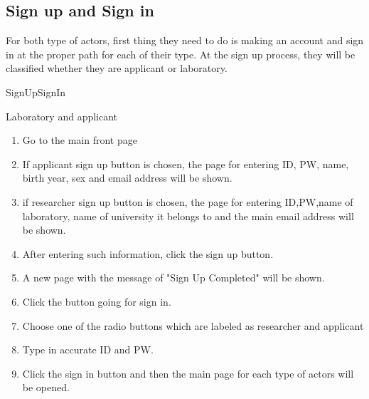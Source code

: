 \documentclass[letterpaper, 10 pt, conference]{ieeeconf}  %
\begin{document}
\subsection{Sign up and Sign in}
For both type of actors, first thing they need to do is making an account and sign in at the proper path for each of their type. At the sign up process, they will be classified whether they are applicant or laboratory.\\

SignUpSignIn\\

Laboratory and applicant\\

\begin{enumerate}
\item Go to the main front page
\item If applicant sign up button is chosen, the page for entering ID, PW, name, birth year, sex and email address will be shown.
\item if researcher sign up button is chosen, the page for entering ID,PW,name of laboratory, name of university it belongs to and the main email address will be shown.
\item After entering such information, click the sign up button.
\item A new page with the message of "Sign Up Completed" will be shown.
\item Click the button going for sign in. 
\item Choose one of the radio buttons which are labeled as researcher and applicant
\item Type in accurate ID and PW.
\item Click the sign in button and then the main page for each type of actors will be opened. 
\end{enumerate}
\end{document}
